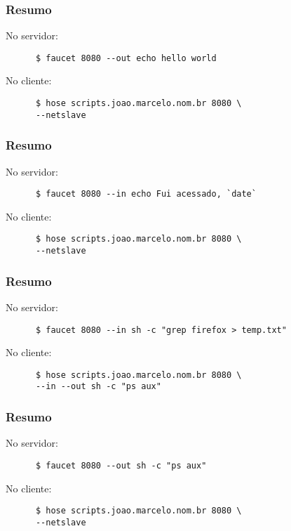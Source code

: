 \documentclass{beamer}
\begin{document}
   \begin{frame}[fragile]
      \frametitle{Resumo}
      No servidor: \\
      \begin{verbatim}
      $ faucet 8080 --out echo hello world 
      \end{verbatim}
      No cliente: 
      \begin{verbatim}
      $ hose scripts.joao.marcelo.nom.br 8080 \ 
      --netslave
      \end{verbatim}
\end{frame}

   \begin{frame}[fragile]
      \frametitle{Resumo}
      No servidor: \\
      \begin{verbatim}
      $ faucet 8080 --in echo Fui acessado, `date`
      \end{verbatim}
      No cliente: \\
      \begin{verbatim}
      $ hose scripts.joao.marcelo.nom.br 8080 \
      --netslave
      \end{verbatim}
\end{frame}

   \begin{frame}[fragile]
      \frametitle{Resumo}
      No servidor: \\
      \begin{verbatim}
      $ faucet 8080 --in sh -c "grep firefox > temp.txt" 
      \end{verbatim}
      No cliente: \\
      \begin{verbatim}
      $ hose scripts.joao.marcelo.nom.br 8080 \ 
      --in --out sh -c "ps aux" 
      \end{verbatim}
\end{frame}

   \begin{frame}[fragile]
      \frametitle{Resumo}
      No servidor: \\
      \begin{verbatim}
      $ faucet 8080 --out sh -c "ps aux" 
      \end{verbatim}
      No cliente: \\
      \begin{verbatim}
      $ hose scripts.joao.marcelo.nom.br 8080 \
      --netslave
      \end{verbatim}
\end{frame}
\end{document}
